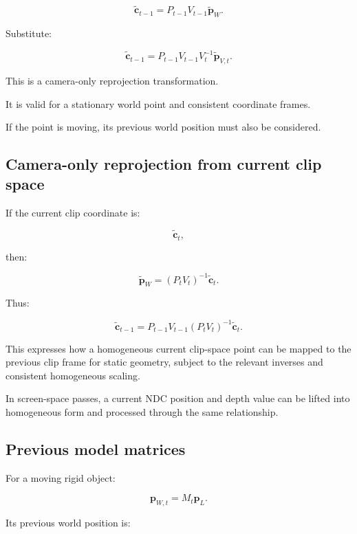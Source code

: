 \[
 \tilde{\mathbf c}_{t-1} = P_{t-1}V_{t-1}\tilde{\mathbf p}_W.
\]

Substitute:

\[
 \boxed{ \tilde{\mathbf c}_{t-1} = P_{t-1}V_{t-1}V_t^{-1} \tilde{\mathbf p}_{V,t} }.
\]

This is a camera-only reprojection transformation.

It is valid for a stationary world point and consistent coordinate frames.

If the point is moving, its previous world position must also be considered.

\subsection{Camera-only reprojection from current clip space}\label{02-foundations-ii-ch036-camera-only-reprojection-from-current-clip-space}

\hypertarget{02-foundations-ii-ch036-camera-only-reprojection-from-current-clip-space}{}

If the current clip coordinate is:

\[
 \tilde{\mathbf c}_t,
\]

then:

\[
 \tilde{\mathbf p}_W = (P_tV_t)^{-1}\tilde{\mathbf c}_t.
\]

Thus:

\[
 \boxed{ \tilde{\mathbf c}_{t-1} = P_{t-1}V_{t-1} (P_tV_t)^{-1} \tilde{\mathbf c}_t }.
\]

This expresses how a homogeneous current clip-space point can be mapped to the previous clip frame for static geometry, subject to the relevant inverses and consistent homogeneous scaling.

In screen-space passes, a current NDC position and depth value can be lifted into homogeneous form and processed through the same relationship.

\subsection{Previous model matrices}\label{02-foundations-ii-ch036-previous-model-matrices}

\hypertarget{02-foundations-ii-ch036-previous-model-matrices}{}

For a moving rigid object:

\[
 \mathbf p_{W,t}=M_t\mathbf p_L.
\]

Its previous world position is:

